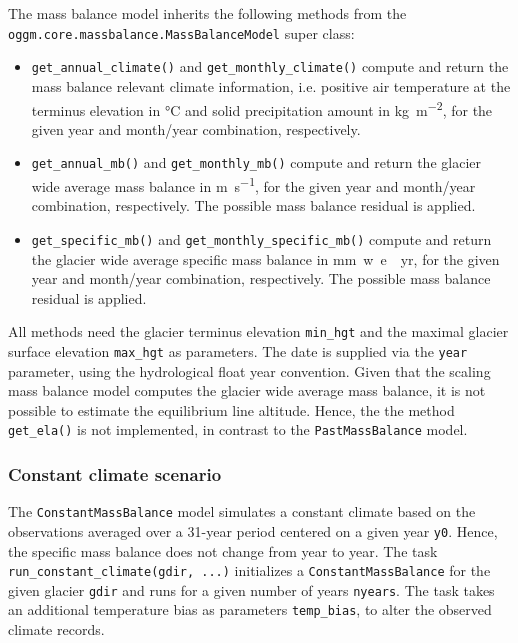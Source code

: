             The \vas{} mass balance model inherits the following methods from the \lstinline`oggm.core.massbalance.MassBalanceModel` super class:
            \begin{itemize}
                \item \lstinline`get_annual_climate()` and \lstinline`get_monthly_climate()` compute and return the mass balance relevant climate information, i.e. positive air temperature at the terminus elevation in \si{\celsius} and solid precipitation amount in \si{\kg\per\square\m}, for the given year and month/year combination, respectively.
                \item \lstinline`get_annual_mb()` and \lstinline`get_monthly_mb()` compute and return the glacier wide average mass balance in \si{\m\per\s}, for the given year and month/year combination, respectively. The possible mass balance residual \bias{} is applied.
                \item \lstinline`get_specific_mb()` and \lstinline`get_monthly_specific_mb()` compute and return the glacier wide average specific mass balance in \si{mm w.e.\per yr}, for the given year and month/year combination, respectively. The possible mass balance residual \bias{} is applied.
            \end{itemize}
            All methods need the glacier terminus elevation \lstinline`min_hgt` and the maximal glacier surface elevation \lstinline`max_hgt` as parameters. The date is supplied via the \lstinline`year` parameter, using the hydrological float year convention. Given that the scaling mass balance model computes the glacier wide average mass balance, it is not possible to estimate the equilibrium line altitude. Hence, the the method \lstinline`get_ela()` is not implemented, in contrast to the \lstinline`PastMassBalance` model.
        

        \subsubsection{Constant climate scenario} %
        \label{ssub:constant_climate_scenario_implementation}
            The \lstinline`ConstantMassBalance` model simulates a constant climate based on the observations averaged over a 31-year period centered on a given year \lstinline`y0`. Hence, the specific mass balance does not change from year to year. The task \lstinline`run_constant_climate(gdir, ...)` initializes a \lstinline`ConstantMassBalance` for the given glacier \lstinline`gdir` and runs for a given number of years \lstinline`nyears`. The task takes an additional temperature bias as parameters \lstinline`temp_bias`, to alter the observed climate records.

